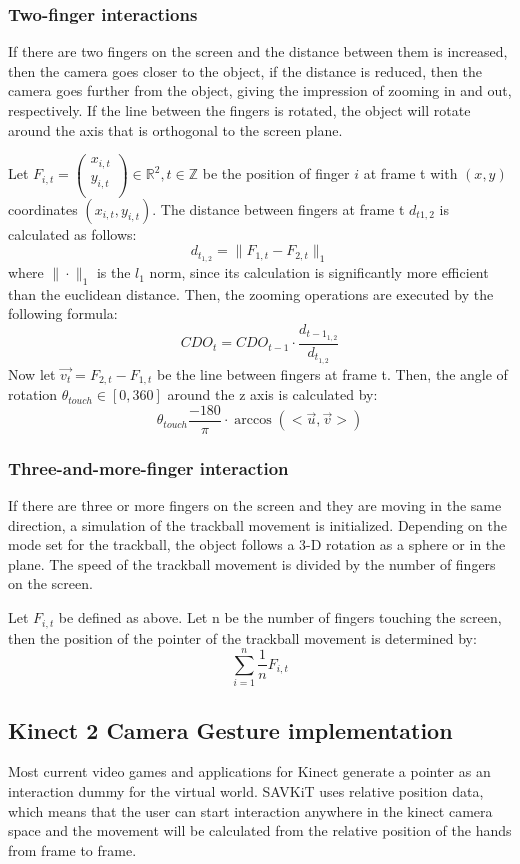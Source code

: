 \documentclass[12pt]{extarticle}
\newcommand{\R}{\mathbb{R}}
\newcommand{\Z}{\mathbb{Z}}
\begin{document}
\subsubsection* {Two-finger interactions}
If there are two fingers on the screen and the distance between them is increased, then the camera goes closer to the object, if the distance is reduced, then the camera goes further from the object, giving the impression of zooming in and out, respectively. If the line between the fingers is rotated, the object will rotate around the axis that is orthogonal to the screen plane.

Let $F_{i,t}=\begin{pmatrix} x_{i,t}\\y_{i,t}\\ \end{pmatrix} \in \R^2, t\in \Z$ be the position of finger $i$ at frame t with $(x,y)$ coordinates $(x_{i,t},y_{i,t})$. The distance between fingers at frame t $d_{t{{1,2}}}$ is calculated as follows:
$$d_{t_{1,2}}=\|F_{1,t}-F_{2,t}\|_1$$
where $\|\cdot \|_1$ is the $l_1$ norm, since its calculation is significantly more efficient than the euclidean distance. Then, the zooming operations are executed by the following formula:
$$CDO_t=CDO_{t-1}\cdot \frac{d_{t-1_{1,2}}}{d_{t_{1,2}}}$$
Now let $\overrightarrow{v_t}=F_{2,t}-F_{1,t}$ be the line between fingers at frame t. Then, the angle of rotation $\theta_{touch}\in [0,360]$ around the z axis is calculated by: 
\[\theta_{touch}\frac{-180}{\pi}\cdot \arccos(<\overrightarrow{u}, \overrightarrow{v}>)\]
\subsubsection* {Three-and-more-finger interaction}
If there are three or more fingers on the screen and they are moving in the same direction, a simulation of the trackball movement is initialized. Depending on the mode set for the trackball, the object follows a 3-D rotation as a sphere or in the plane. The speed of the trackball movement is divided by the number of fingers on the screen.

Let $F_{i,t}$ be defined as above. Let n be the number of fingers touching the screen, then the position of the pointer of the trackball movement is determined by:
$$\sum_{i=1}^n \frac{1}{n}F_{i,t}$$

\subsection {Kinect 2 Camera Gesture implementation}\label{KinectGestures}
Most current video games and applications for Kinect generate a pointer as an interaction dummy for the virtual world. SAVKiT uses relative position data, which means that the user can start interaction anywhere in the kinect camera space and the movement will be calculated from the relative position of the hands from frame to frame.
\end{document}
